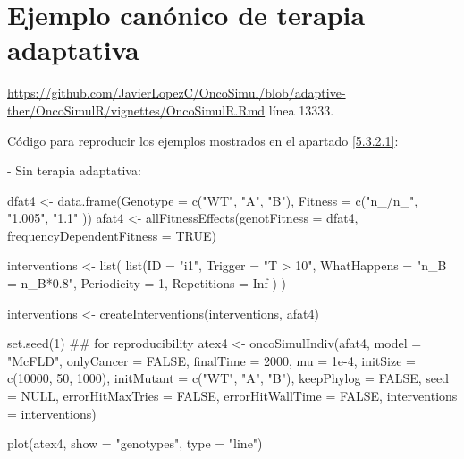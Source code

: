 \section{Ejemplo canónico de terapia adaptativa}\label{A.3}

\url{https://github.com/JavierLopezC/OncoSimul/blob/adaptive-ther/OncoSimulR/vignettes/OncoSimulR.Rmd} línea 13333.

Código para reproducir los ejemplos mostrados en el apartado \ref{5.3.2.1}:

- Sin terapia adaptativa:

\begin{R}
	dfat4 <- data.frame(Genotype = c("WT", "A", "B"), 
	Fitness = c("n_/n_",
	"1.005",
	"1.1"
	))
	afat4 <- allFitnessEffects(genotFitness = dfat4, 
	frequencyDependentFitness = TRUE)
	
	interventions <- list(
	list(ID           = "i1",
	Trigger       = "T > 10",
	WhatHappens   = "n_B = n_B*0.8",
	Periodicity   = 1,
	Repetitions   = Inf
	)
	)
	
	interventions <- createInterventions(interventions, afat4)
	
	set.seed(1) ## for reproducibility
	atex4 <- oncoSimulIndiv(afat4,
	model = "McFLD", 
	onlyCancer = FALSE, 
	finalTime = 2000,
	mu = 1e-4,
	initSize = c(10000, 50, 1000), 
	initMutant = c("WT", "A", "B"),
	keepPhylog = FALSE,
	seed = NULL, 
	errorHitMaxTries = FALSE, 
	errorHitWallTime = FALSE,
	interventions = interventions)
	
	plot(atex4, show = "genotypes", type = "line")
\end{R}

